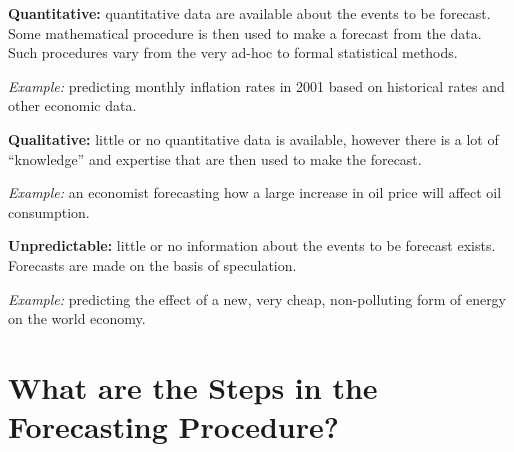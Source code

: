 \documentclass[a4paper,11pt,oneside,onecolumn]{book}
\begin{document}
\begin{list}{}{}

\item[\textbf{Quantitative:}] quantitative data are available about
the events to be forecast.  Some mathematical procedure is then used
to make a forecast from the data. Such procedures vary from the very
ad-hoc to formal statistical methods. 

\textit{Example:} predicting monthly
inflation rates in 2001 based on historical rates and other economic
data.
\item[\textbf{Qualitative:}] little or no  quantitative data is available,
however there is a lot of ``knowledge'' and expertise that are then
used to make the forecast. 

\textit{Example:} an economist forecasting how a
large increase in oil price will affect oil consumption.

\item[\textbf{Unpredictable:}] little or no information about the events to
be forecast exists. Forecasts are made on the basis of speculation.

\textit{Example:} predicting the effect of a new, very cheap, non-polluting
form of energy on the world economy.
\end{list}




\section{What are the Steps in the Forecasting Procedure?}
\end{document}
